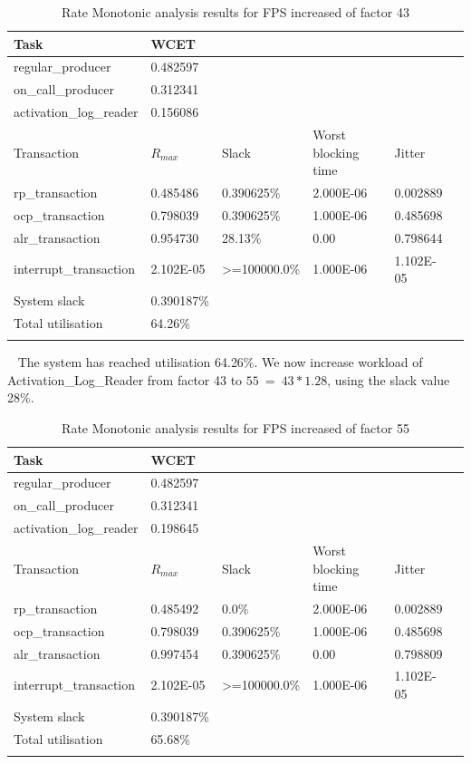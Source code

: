 \documentclass{article}
\begin{document}
\begin{longtable}{llllll}
   \toprule
   Task & WCET \\
   \midrule
   regular\_producer & 0.482597 \\
   on\_call\_producer & 0.312341 \\
   activation\_log\_reader & 0.156086 \\
   \toprule
   \toprule
   Transaction & $R_{max}$ & Slack & Worst blocking time & Jitter \\
   \midrule
   rp\_transaction & 0.485486  & 0.390625\% &  2.000E-06 & 0.002889 \\
   ocp\_transaction & 0.798039 & 0.390625\% & 1.000E-06 & 0.485698 \\
   alr\_transaction & 0.954730 & 28.13\% & 0.00 & 0.798644 \\
   interrupt\_transaction & 2.102E-05 & >=100000.0\% & 1.000E-06 & 1.102E-05 \\
   \toprule
   \toprule
   System slack & 0.390187\% \\
   Total utilisation & 64.26\% \\
   \bottomrule
   \caption{Rate Monotonic analysis results for FPS increased of factor 43}
\label{tab:rm-fps-24-ocp-44}
\end{longtable}
 
The system has reached utilisation 64.26\%. We now increase workload of Activation\_Log\_Reader from factor 43 to $55\ =\ 43 * 1.28$, using the slack value 28\%.

\begin{longtable}{llllll}
   \toprule
   Task & WCET \\
   \midrule
   regular\_producer & 0.482597 \\
   on\_call\_producer & 0.312341 \\
   activation\_log\_reader & 0.198645 \\
   \toprule
   \toprule
   Transaction & $R_{max}$ & Slack & Worst blocking time & Jitter \\
   \midrule
   rp\_transaction & 0.485492  & 0.0\% &  2.000E-06 & 0.002889 \\
   ocp\_transaction & 0.798039 & 0.390625\% & 1.000E-06 & 0.485698 \\
   alr\_transaction & 0.997454 & 0.390625\% & 0.00 & 0.798809 \\
   interrupt\_transaction & 2.102E-05 & >=100000.0\% & 1.000E-06 & 1.102E-05 \\
   \toprule
   \toprule
   System slack & 0.390187\% \\
   Total utilisation & 65.68\% \\
   \bottomrule
   \caption{Rate Monotonic analysis results for FPS increased of factor 55}
\label{tab:rm-fps-24-ocp-44-alr-56}
\end{longtable}
\end{document}
